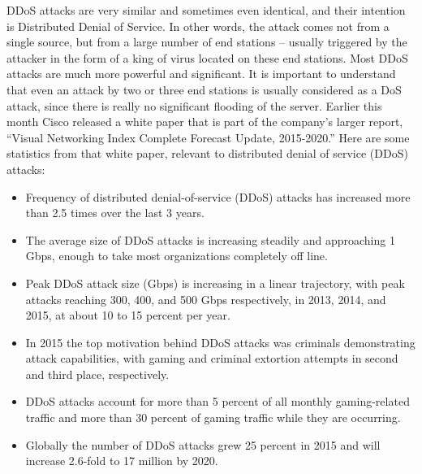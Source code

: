 \documentclass{article}
\begin{document}
\hfill \break DDoS attacks are very similar and sometimes even identical, and their intention is Distributed Denial of Service. In other words, the attack comes not from a single source, but from a large number of end stations – usually triggered by the attacker in the form of a king of virus located on these end stations. Most DDoS attacks are much more powerful and significant. It is important to understand that even an attack by two or three end stations is usually considered as a DoS attack, since there is really no significant flooding of the server.
\hfill \break Earlier this month Cisco released a white paper that is part of the company’s larger report, “Visual Networking Index Complete Forecast Update, 2015-2020.” Here are some statistics from that white paper, relevant to distributed denial of service (DDoS) attacks:
\begin{itemize}
\item Frequency of distributed denial-of-service (DDoS) attacks has increased more than 2.5 times over the last 3 years.
\item	The average size of DDoS attacks is increasing steadily and approaching 1 Gbps, enough to take most organizations completely off line.
\item	Peak DDoS attack size (Gbps) is increasing in a linear trajectory, with peak attacks reaching 300, 400, and 500 Gbps respectively, in 2013, 2014, and 2015, at about 10 to 15 percent per year.
\item	In 2015 the top motivation behind DDoS attacks was criminals demonstrating attack capabilities, with gaming and criminal extortion attempts in second and third place, respectively.
\item	DDoS attacks account for more than 5 percent of all monthly gaming-related traffic and more than 30 percent of gaming traffic while they are occurring.
\item	Globally the number of DDoS attacks grew 25 percent in 2015 and will increase 2.6-fold to 17 million by 2020.
\end{itemize}
\end{document}

